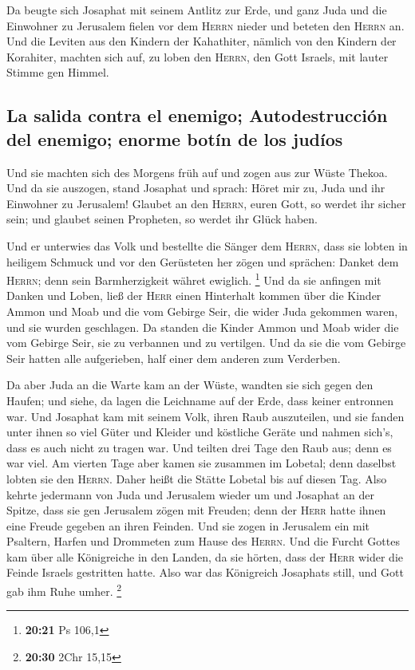 Da beugte sich Josaphat mit seinem Antlitz zur Erde, und
ganz Juda und die Einwohner zu Jerusalem fielen vor dem \textsc{Herrn}
nieder und beteten den \textsc{Herrn} an.  Und die
Leviten aus den Kindern der Kahathiter, nämlich von den Kindern der
Korahiter, machten sich auf, zu loben den \textsc{Herrn}, den Gott
Israels, mit lauter Stimme gen Himmel.

\hypertarget{la-salida-contra-el-enemigo-autodestrucciuxf3n-del-enemigo-enorme-botuxedn-de-los-juduxedos}{%
\subsection{La salida contra el enemigo; Autodestrucción del enemigo;
enorme botín de los
judíos}\label{la-salida-contra-el-enemigo-autodestrucciuxf3n-del-enemigo-enorme-botuxedn-de-los-juduxedos}}

 Und sie machten sich des Morgens früh auf und zogen aus
zur Wüste Thekoa. Und da sie auszogen, stand Josaphat und sprach: Höret
mir zu, Juda und ihr Einwohner zu Jerusalem! Glaubet an den
\textsc{Herrn}, euren Gott, so werdet ihr sicher sein; und glaubet
seinen Propheten, so werdet ihr Glück haben.

 Und er unterwies das Volk und bestellte die Sänger dem
\textsc{Herrn}, dass sie lobten in heiligem Schmuck und vor den
Gerüsteten her zögen und sprächen: Danket dem \textsc{Herrn}; denn sein
Barmherzigkeit währet ewiglich. \footnote{\textbf{20:21} Ps 106,1}
 Und da sie anfingen mit Danken und Loben, ließ der
\textsc{Herr} einen Hinterhalt kommen über die Kinder Ammon und Moab und
die vom Gebirge Seir, die wider Juda gekommen waren, und sie wurden
geschlagen.  Da standen die Kinder Ammon und Moab wider
die vom Gebirge Seir, sie zu verbannen und zu vertilgen. Und da sie die
vom Gebirge Seir hatten alle aufgerieben, half einer dem anderen zum
Verderben.

 Da aber Juda an die Warte kam an der Wüste, wandten sie
sich gegen den Haufen; und siehe, da lagen die Leichname auf der Erde,
dass keiner entronnen war.  Und Josaphat kam mit seinem
Volk, ihren Raub auszuteilen, und sie fanden unter ihnen so viel Güter
und Kleider und köstliche Geräte und nahmen sich's, dass es auch nicht
zu tragen war. Und teilten drei Tage den Raub aus; denn es war viel.
 Am vierten Tage aber kamen sie zusammen im Lobetal; denn
daselbst lobten sie den \textsc{Herrn}. Daher heißt die Stätte Lobetal
bis auf diesen Tag.  Also kehrte jedermann von Juda und
Jerusalem wieder um und Josaphat an der Spitze, dass sie gen Jerusalem
zögen mit Freuden; denn der \textsc{Herr} hatte ihnen eine Freude
gegeben an ihren Feinden.  Und sie zogen in Jerusalem ein
mit Psaltern, Harfen und Drommeten zum Hause des \textsc{Herrn}.
 Und die Furcht Gottes kam über alle Königreiche in den
Landen, da sie hörten, dass der \textsc{Herr} wider die Feinde Israels
gestritten hatte.  Also war das Königreich Josaphats
still, und Gott gab ihm Ruhe umher. \footnote{\textbf{20:30} 2Chr 15,15}

